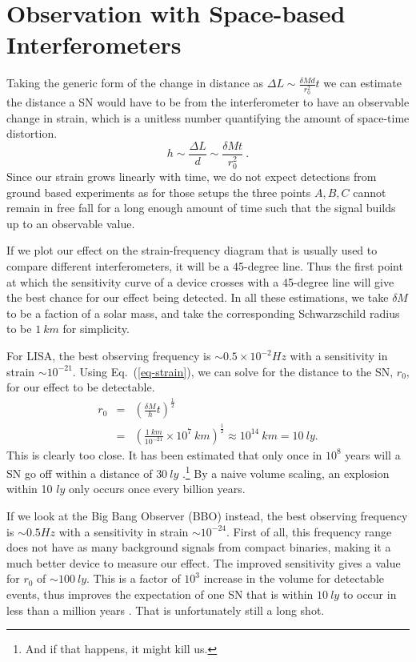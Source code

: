 \documentclass[aps,showpacs,onecolumn,floats,prd,superscriptaddress,nofootinbib]{revtex4-1}
\begin{document}
 \section{Observation with Space-based Interferometers}
\label{obs}
Taking the generic form of the change in distance as $\Delta L \sim \frac{\delta M d}{r_0^2} t$ we can estimate the distance a SN would have to be from the interferometer to have an observable change in strain, which is a unitless number quantifying the amount of space-time distortion.
\begin{equation}
h \sim \frac{\Delta L}{d} \sim \frac{\delta M t}{r_0^2}~.
\label{eq-strain}
\end{equation} 
Since our strain grows linearly with time, we do not expect detections from ground based experiments as for those setups the three points $A,B,C$ cannot remain in free fall for a long enough amount of time such that the signal builds up to an observable value. 

If we plot our effect on the strain-frequency diagram \cite{GWcurves} that is usually used to compare different interferometers, it will be a 45-degree line. Thus the first point at which the sensitivity curve of a device crosses with a 45-degree line will give the best chance for our effect being detected. In all these estimations, we take $\delta M$ to be a faction of a solar mass, and take the corresponding Schwarzschild radius to be $1~km$ for simplicity.

For LISA, the best observing frequency is $\sim 0.5 \times10^{-2} Hz$ with a sensitivity in strain $\sim 10^{-21}$. Using Eq.~(\ref{eq-strain}), we can solve for the distance to the SN, $r_0$, for our effect to be detectable.
\begin{eqnarray}
	r_0 & = &  \left(  \frac{\delta M}{h} t \right)^\frac{1}{2} \label{Meas}	\\
	& = &  \left( \frac{1 \ km}{10^{-21}} \times 10^7 \ km \right)^\frac{1}{2} \approx 10^{14} \ km = 10 \ ly.
\end{eqnarray}
This is clearly too close. It has been estimated that only once in $10^8$ years will a SN go off within a distance of $30 \ ly$ \cite{EllSch93}.\footnote{And if that happens, it might kill us.} By a naive volume scaling, an explosion within 10 $ly$ only occurs once every billion years.

If we look at the Big Bang Observer (BBO) instead, the best observing frequency is $\sim 0.5 Hz$ with a sensitivity in strain $\sim 10^{-24}$. First of all, this frequency range does not have as many background signals from compact binaries, making it a much better device to measure our effect. The improved sensitivity gives a value for $r_0$ of $\sim 100 \ ly$. This is a factor of $10^3$ increase in the volume for detectable events, thus improves the expectation of one SN that is within $10 \ ly$ to occur in less than a million years . That is unfortunately still a long shot.
\end{document}

